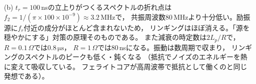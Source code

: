 \begin{enumerate}
(b) $t_r = 100$\,nsの立上りがつくるスペクトルの折れ点は
$f_2 = 1/(\pi \times 100\times10^{-9}) \approx 3.2$\,MHzで，
共振周波数$80$\,MHzより十分低い。励振源に$f_r$付近の成分がほとんど含まれないため，
リンギングはほぼ消える。「源を穏やかにする」対策の原理そのものである。
また減衰の時定数は$2L_p/R$で，$R = 0.1\,\Omega$では$0.8\,\mathrm{\mu s}$，
$R = 1\,\Omega$では$80$\,nsになる。振動は数周期で収まり，
リンギングのスペクトルのピークも低く・鈍くなる
（抵抗でノイズのエネルギーを熱に変えて吸収している。
フェライトコアが高周波帯で抵抗として働くのと同じ発想である）。
\end{enumerate}
